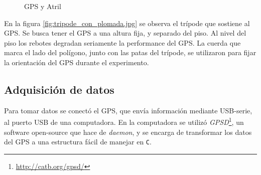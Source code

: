 \documentclass[main]{subfiles}
\begin{document}
\begin{figure}
  \vspace{-30pt}
  \centering
\vspace{-10pt}
  \caption{GPS y Atril}
  \label{fig:rebotes}
  \vspace{-20pt}
\end{figure}

En la figura \ref{fig:tripode_con_plomada.jpg} se observa el trípode que sostiene al GPS. Se busca tener el GPS a una altura fija, y separado del piso. Al nivel del piso los rebotes degradan seriamente la performance del GPS. La cuerda que marca el lado del polígono, junto con las patas del trípode, se utilizaron para fijar la orientación del GPS durante el experimento.

\subsection{Adquisición de datos}
\label{sec:adquisicion-de-datos}

Para tomar datos se conectó el GPS, que env\'ia información mediante USB-serie, al puerto USB de una computadora. En la computadora se utilizó \textit{GPSD}\footnote{\url{http://catb.org/gpsd/}}, un software open-source que hace de \textit{daemon}, y se encarga de transformar los datos del GPS a una estructura fácil de manejar en \verb+C+.
\end{document}
